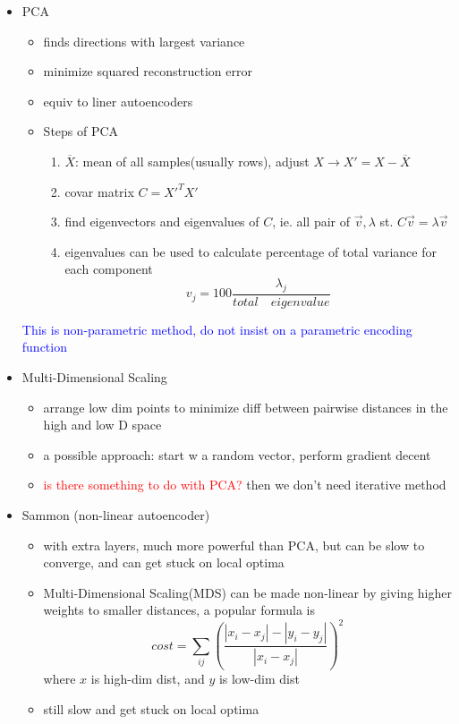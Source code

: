 \documentclass[font=12pt]{article}
\begin{document}
\begin{itemize}
	\item PCA
		\begin{itemize}
			\item finds directions with largest variance
			\item minimize squared reconstruction error
			\item equiv to liner autoencoders
			\item Steps of PCA
			\begin{enumerate}
				\item $\overline{X}$: mean of all samples(usually rows), adjust $ X \rightarrow X' = X - \overline{X}$ 
				\item covar matrix $ C = X'^T X'$
				\item find eigenvectors and eigenvalues of $C$, ie. all pair of $\vec{v}, \lambda$ st. $ C\vec{v} = \lambda \vec{v}$
				\item eigenvalues can be used to calculate percentage of total variance for each component \[v_j = 100\frac{\lambda_j}{total \quad eigenvalue}\] 
			\end{enumerate}
		\end{itemize}
		\textcolor{blue}{This is non-parametric method, do not insist on a parametric encoding function}
	\item Multi-Dimensional Scaling
		\begin{itemize}
			\item  arrange low dim points to minimize diff between pairwise distances in the high and low D space
			\item a possible approach: start w a random vector, perform gradient decent
			\item \textcolor{red}{is there something to do with PCA?} then we don't need iterative method
		\end{itemize}
	\item Sammon (non-linear autoencoder)
		\begin{itemize}
			\item  with extra layers, much more powerful than PCA, but can be slow to converge, and can get stuck on local optima
			\item Multi-Dimensional Scaling(MDS) can be made non-linear by giving higher weights to smaller distances, a popular formula is 
				\[ cost = \sum_{ij} \left(\frac{|x_i - x_j| - |y_{i}-y_j|}{|x_i - x_j|}\right)^2\]
				where $ x$ is high-dim dist, and  $y$ is low-dim dist
			\item still slow and get stuck on local optima
		\end{itemize}
\end{itemize}
\end{document}
